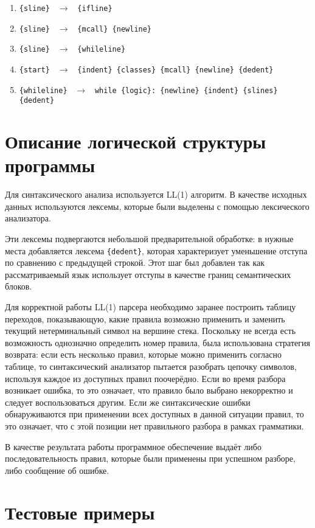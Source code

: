 \documentclass[a4paper,10pt,notitlepage,pdftex]{scrreprt}
\begin{document}
\begin{enumerate}
                \item \verb'{sline} ' $\rightarrow$ \verb' {ifline}'
                \item \verb'{sline} ' $\rightarrow$ \verb' {mcall} {newline}'
                \item \verb'{sline} ' $\rightarrow$ \verb' {whileline}'
                \item \verb'{start} ' $\rightarrow$ \verb' {indent} {classes} {mcall} {newline} {dedent}'
                \item \verb'{whileline} ' $\rightarrow$ \verb' while {logic}: {newline} {indent} {slines} {dedent}'
            \end{enumerate}
\chapter{Описание логической структуры программы}
\label{chap:third}
    Для синтаксического анализа используется LL(1) алгоритм.
    В качестве исходных данных используются лексемы, которые были выделены с помощью лексического анализатора.

    Эти лексемы подвергаются небольшой предварительной обработке: в нужные места добавляется лексема \verb'{dedent}',
    которая характеризует уменьшение отступа по сравнению с предыдущей строкой.
    Этот шаг был добавлен так как рассматриваемый язык использует отступы в качестве границ семантических блоков.

    Для корректной работы LL(1) парсера необходимо заранее построить таблицу переходов, показывающую, какие правила
    возможно применить и заменить текущий нетерминальный символ на вершине стека.
    Поскольку не всегда есть возможность однозначно определить номер правила, была использована стратегия возврата:
    если есть несколько правил, которые можно применить согласно таблице, то синтаксический анализатор пытается
    разобрать цепочку символов, используя каждое из доступных правил поочерёдно.
    Если во время разбора возникает ошибка, то это означает, что правило было выбрано некорректно и следует
    воспользоваться другим.
    Если же синтаксические ошибки обнаруживаются при применении всех доступных в данной ситуации правил, то это
    означает, что с этой позиции нет правильного разбора в рамках грамматики.

    В качестве результата работы программное обеспечение выдаёт либо последовательность правил, которые были применены
    при успешном разборе, либо сообщение об ошибке.

\chapter{Тестовые примеры}
\label{chap:fourth}
\end{document}
